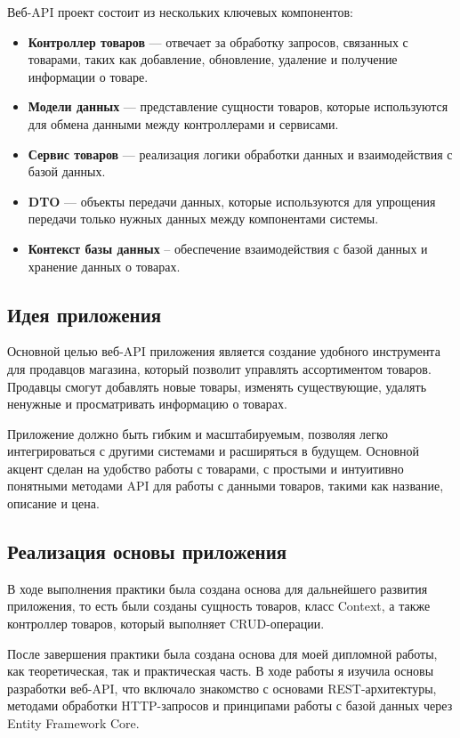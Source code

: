\documentclass[a4paper,12pt]{report}
\begin{document}
Веб-\ac{API} проект состоит из нескольких ключевых компонентов:
\begin{itemize}
  \item
  \textbf{Контроллер товаров} --- отвечает за обработку запросов, связанных с товарами, таких как добавление, обновление, удаление и получение информации о товаре.
  \item 
  \textbf{Модели данных} --- представление сущности товаров, которые используются для обмена данными между контроллерами и сервисами.
  \item
  \textbf{Сервис товаров} --- реализация логики обработки данных и взаимодействия с базой данных.
  \item
  \textbf{\ac{DTO}} --- объекты передачи данных, которые используются для упрощения передачи только нужных данных между компонентами системы.
  \item
  \textbf{Контекст базы данных} -- обеспечение взаимодействия с базой данных и хранение данных о товарах.
\end{itemize}

\subsection{Идея приложения}

Основной целью веб-\ac{API} приложения является создание удобного инструмента для продавцов магазина, 
который позволит управлять ассортиментом товаров. Продавцы смогут добавлять новые товары, 
изменять существующие, удалять ненужные и просматривать информацию о товарах.

Приложение должно быть гибким и масштабируемым, позволяя легко интегрироваться с другими системами и расширяться в будущем. 
Основной акцент сделан на удобство работы с товарами, с простыми и интуитивно понятными методами \ac{API} для работы с данными товаров, 
такими как название, описание и цена.

\subsection{Реализация основы приложения}

В ходе выполнения практики была создана основа для дальнейшего развития приложения, то есть были созданы сущность товаров, класс Context, 
а также контроллер товаров, который выполняет CRUD-операции.


После завершения практики была создана основа для моей дипломной работы, как теоретическая, так и практическая часть. 
В ходе работы я изучила основы разработки веб-\ac{API}, что включало знакомство с основами \ac{REST}-архитектуры, методами обработки 
\ac{HTTP}-запросов и принципами работы с базой данных через Entity Framework Core.
\end{document}
